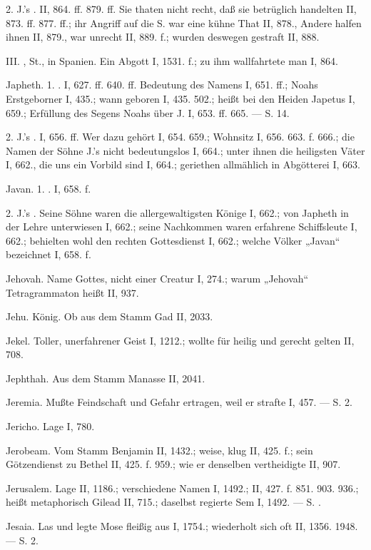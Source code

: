2. J.’s . II, 864. ff. 879. ff. Sie thaten nicht recht, daß sie betrüglich handelten II, 873. ff. 877. ff.; ihr Angriff auf die S. war eine kühne That II, 878., Andere halfen ihnen II, 879., war unrecht II, 889. f.; wurden deswegen gestraft II, 888.

III. , St., in Spanien. Ein Abgott I, 1531. f.; zu ihm wallfahrtete man I, 864.

Japheth. 1. . I, 627. ff. 640. ff. Bedeutung des Namens I, 651. ff.; Noahs Erstgeborner I, 435.; wann geboren I, 435. 502.; heißt bei den Heiden Japetus I, 659.; Erfüllung des Segens Noahs über J. I, 653. ff. 665. — S.  14.

2. J.’s . I, 656. ff. Wer dazu gehört I, 654. 659.; Wohnsitz I, 656. 663. f. 666.; die Namen der Söhne J.’s nicht bedeutungslos I, 664.; unter ihnen die heiligsten Väter I, 662., die uns ein Vorbild sind I, 664.; geriethen allmählich in Abgötterei I, 663.

Javan. 1. . I, 658. f.

2. J.’s . Seine Söhne waren die allergewaltigsten Könige I, 662.; von Japheth in der Lehre unterwiesen I, 662.; seine Nachkommen waren erfahrene Schiffsleute I, 662.; behielten wohl den rechten Gottesdienst I, 662.; welche Völker „Javan“ bezeichnet I, 658. f.

Jehovah. Name Gottes, nicht einer Creatur I, 274.; warum „Jehovah“ Tetragrammaton heißt II, 937.

Jehu. König. Ob aus dem Stamm Gad II, 2033.

Jekel. Toller, unerfahrener Geist I, 1212.; wollte für heilig und gerecht gelten II, 708.

Jephthah. Aus dem Stamm Manasse II, 2041.

Jeremia. Mußte Feindschaft und Gefahr ertragen, weil er strafte I, 457. — S.  2.

Jericho. Lage I, 780.

Jerobeam. Vom Stamm Benjamin II, 1432.; weise, klug II, 425. f.; sein Götzendienst zu Bethel II, 425. f. 959.; wie er denselben vertheidigte II, 907.

Jerusalem. Lage II, 1186.; verschiedene Namen I, 1492.; II, 427. f. 851. 903. 936.; heißt metaphorisch Gilead II, 715.; daselbst regierte Sem I, 1492. — S. .

Jesaia. Las und legte Mose fleißig aus I, 1754.; wiederholt sich oft II, 1356. 1948. — S.  2.

